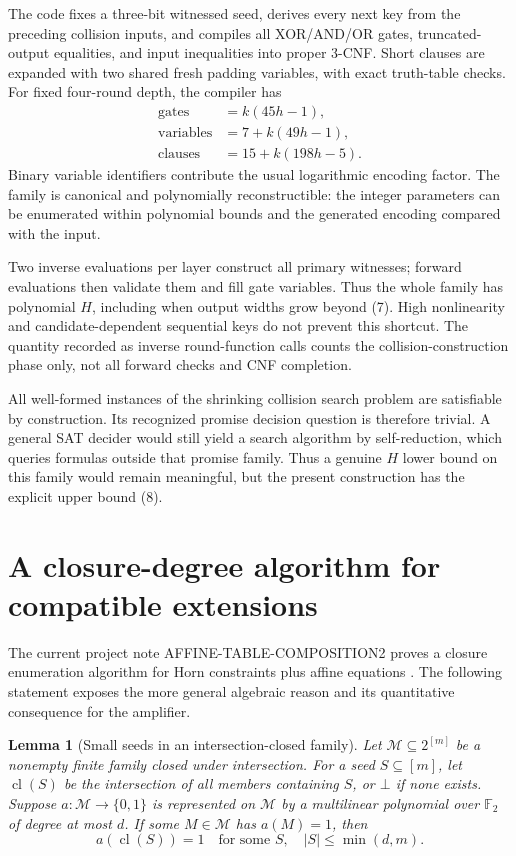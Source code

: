 \documentclass[11pt]{article}
\newtheorem{lemma}{Lemma}
\newcommand{\cl}{\operatorname{cl}}
\newcommand{\F}{\mathbb F_2}
\begin{document}
The code fixes a three-bit witnessed seed, derives every next key from
the preceding collision inputs, and compiles all XOR/AND/OR gates,
truncated-output equalities, and input inequalities into proper 3-CNF.
Short clauses are expanded with two shared fresh padding variables,
with exact truth-table checks.
For fixed four-round depth, the compiler has
\[
 \begin{aligned}
 \text{gates}&=k(45h-1),\\
 \text{variables}&=7+k(49h-1),\\
 \text{clauses}&=15+k(198h-5).
 \end{aligned}
 \tag{10}
\]
Binary variable identifiers contribute the usual logarithmic encoding
factor. The family is canonical and polynomially reconstructible:
the integer parameters can be enumerated within polynomial bounds
and the generated encoding compared with the input.

Two inverse evaluations per layer construct all primary witnesses;
forward evaluations then validate them and fill gate variables.
Thus the whole family has polynomial $H$, including when output widths
grow beyond (7). High nonlinearity and candidate-dependent sequential keys
do not prevent this shortcut. The quantity recorded as inverse
round-function calls counts the collision-construction phase only,
not all forward checks and CNF completion.

All well-formed instances of the shrinking collision search problem
are satisfiable by construction. Its recognized promise decision
question is therefore trivial. A general SAT decider would still yield
a search algorithm by self-reduction, which queries formulas outside
that promise family. Thus a genuine $H$ lower bound on this family
would remain meaningful, but the present construction has the explicit
upper bound (8).

\section{A closure-degree algorithm for compatible extensions}

The current project note AFFINE-TABLE-COMPOSITION2 proves a closure
enumeration algorithm for Horn constraints plus affine equations
\cite{atc2026}. The following statement exposes the more general
algebraic reason and its quantitative consequence for the amplifier.

\begin{lemma}[Small seeds in an intersection-closed family]\label{lem:seed}
Let $\mathcal M\subseteq 2^{[m]}$ be a nonempty finite family closed under
intersection. For a seed $S\subseteq[m]$, let $\cl(S)$ be the intersection
of all members containing $S$, or $\bot$ if none exists.
Suppose $a:\mathcal M\to\{0,1\}$ is represented on $\mathcal M$ by a
multilinear polynomial over $\F$ of degree at most $d$.
If some $M\in\mathcal M$ has $a(M)=1$, then
\[
 a(\cl(S))=1
 \quad\text{for some }S,\quad |S|\le \min(d,m).
 \tag{11}
\]
\end{lemma}
\end{document}
